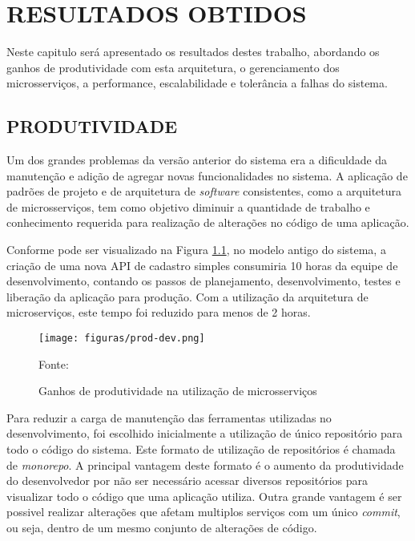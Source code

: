 \chapter{RESULTADOS OBTIDOS}
\label{chp:resultados}

Neste capitulo será apresentado os resultados destes trabalho, abordando os
ganhos de produtividade com esta arquitetura, o gerenciamento dos
microsserviços, a performance, escalabilidade e tolerância a falhas do sistema.

\section{PRODUTIVIDADE}

Um dos grandes problemas da versão anterior do sistema era a dificuldade da
manutenção e adição de agregar novas funcionalidades no sistema. A aplicação
de padrões de projeto e de arquitetura de \emph{software} consistentes,
como a arquitetura de microsserviços, tem como objetivo diminuir a quantidade
de trabalho e conhecimento requerida para realização de alterações no código
de uma aplicação.

Conforme pode ser visualizado na Figura \ref{fig:prod-dev}, no modelo antigo
do sistema, a criação de uma nova \ac{API} de cadastro simples consumiria
10 horas da equipe de desenvolvimento, contando os passos de planejamento,
desenvolvimento, testes e liberação da aplicação para produção. Com a
utilização da arquitetura de microserviços, este tempo foi reduzido para
menos de 2 horas.

\begin{figure}[H]
	\centering
	\caption{Ganhos de produtividade na utilização de microsserviços}
	\texttt{[image: figuras/prod-dev.png]}

	\label{fig:prod-dev}
	\footnotesize Fonte: \fonteOAutor
\end{figure}

Para reduzir a carga de manutenção das ferramentas utilizadas no
desenvolvimento, foi escolhido inicialmente a utilização de único
repositório para todo o código do sistema. Este formato de utilização de
repositórios é chamada de \emph{monorepo}. A principal vantagem deste
formato é o aumento da produtividade do desenvolvedor por não ser necessário
acessar diversos repositórios para visualizar todo o código que uma aplicação
utiliza. Outra grande vantagem é ser possivel realizar alterações que afetam
multiplos serviços com um único \emph{commit}, ou seja, dentro de um mesmo
conjunto de alterações de código.

